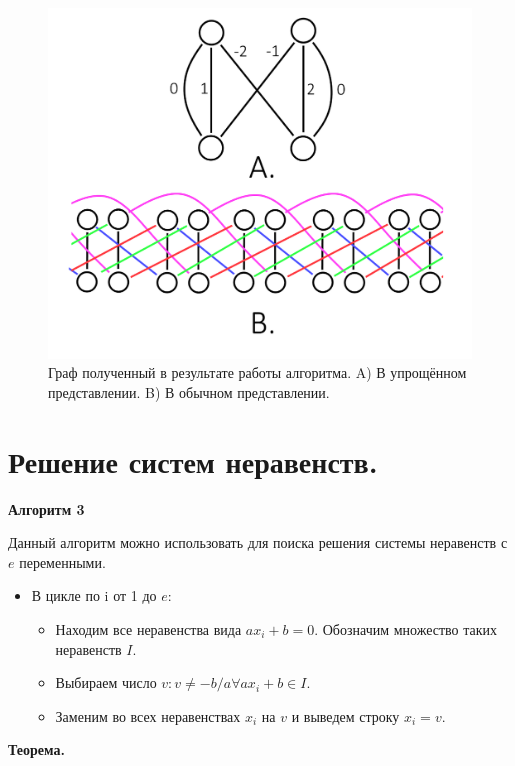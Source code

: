 \documentclass[14pt]{mmcs_article}
\begin{document}
\begin{figure}[H]
  \centering
  \includegraphics[scale=0.4]{Fig_7.png}
  \caption{ Граф полученный в результате работы алгоритма. A) В упрощённом представлении. B) В обычном представлении. }
  \label{image:7}
\end{figure}

\newpage

\section{Решение систем неравенств.}

\textbf{Алгоритм 3}

Данный алгоритм можно использовать для поиска решения системы неравенств с $e$ переменными.

\begin{itemize}
  \item В цикле по i от 1 до $e$:
  \begin{itemize}
    \item Находим все неравенства  вида $a x_i + b = 0$. Обозначим множество таких неравенств $I$.
    \item Выбираем число $v: v \neq -b/a \forall a x_i + b \in I$.
    \item Заменим во всех неравенствах $x_i$ на $v$ и выведем строку $x_i = v$.
  \end{itemize}
\end{itemize}

\textbf{Теорема.}
\end{document}
